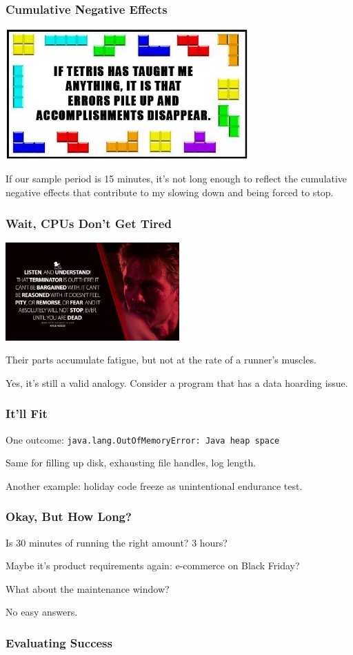 \begin{frame}
\frametitle{Cumulative Negative Effects}

\begin{center}
  \includegraphics[width=0.7\textwidth]{images/tetris.jpg}
\end{center}

If our sample period is 15 minutes, it's not long enough to reflect the cumulative negative effects that contribute to my slowing down and being forced to stop. 

\end{frame}

\begin{frame}
\frametitle{Wait, CPUs Don't Get Tired}

\begin{center}
  \includegraphics[width=0.5\textwidth]{images/dont-get-tired.jpg}
\end{center}

Their parts accumulate fatigue, but not at the rate of a runner's muscles.

Yes, it's still a valid analogy. Consider a program that has a data hoarding issue.

\end{frame}

\begin{frame}
\frametitle{It'll Fit}

One outcome: \texttt{java.lang.OutOfMemoryError: Java heap space}

Same for filling up disk, exhausting file handles, log length.

Another example: holiday code freeze as unintentional endurance test.

\end{frame}

\begin{frame}
\frametitle{Okay, But How Long?}
Is 30 minutes of running the right amount? 3 hours?

Maybe it's product requirements again: e-commerce on Black Friday?

What about the maintenance window?

No easy answers.

\end{frame}


\begin{frame}
\frametitle{Evaluating Success}

\end{frame}

